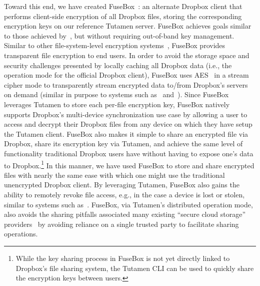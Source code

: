 Toward this end, we have created FuseBox~\cite{fusebox}: an alternate
Dropbox client that performs client-side encryption of all Dropbox
files, storing the corresponding encryption keys on our reference
Tutamen server. FuseBox achieves goals similar to those achieved
by~\cite{goh2003}, but without requiring out-of-band key
management. Similar to other file-system-level encryption
systems~\cite{blaze1993, Cattaneo2001, halcrow}, FuseBox provides
transparent file encryption to end users. In order to avoid the
storage space and security challenges presented by locally caching all
Dropbox data (i.e., the operation mode for the official Dropbox
client), FuseBox uses AES~\cite{daemen1999, nist2001} in a stream
cipher mode to transparently stream encrypted data to/from Dropbox's
servers on demand (similar in purpose to systems such
as~\cite{tang2012} and~\cite{xia2015}). Since FuseBox leverages
Tutamen to store each per-file encryption key, FuseBox natively
supports Dropbox's multi-device synchronization use case by allowing a
user to access and decrypt their Dropbox files from any device on
which they have setup the Tutamen client. FuseBox also makes it simple
to share an encrypted file via Dropbox, share its encryption key via
Tutamen, and achieve the same level of functionality traditional
Dropbox users have without having to expose one's data to
Dropbox.\footnote{While the key sharing process in FuseBox is not yet
  directly linked to Dropbox's file sharing system, the Tutamen CLI
  can be used to quickly share the encryption keys between users.} In
this manner, we have used FuseBox to store and share encrypted files
with nearly the same ease with which one might use the traditional
unencrypted Dropbox client. By leveraging Tutamen, FuseBox also gains
the ability to remotely revoke file access, e.g., in the case a device
is lost or stolen, similar to systems such
as~\cite{geambasu2011}. FuseBox, via Tutamen's distributed operation
mode, also avoids the sharing pitfalls associated many existing
``secure cloud storage'' providers~\cite{wilson2014} by avoiding
reliance on a single trusted party to facilitate sharing operations.

